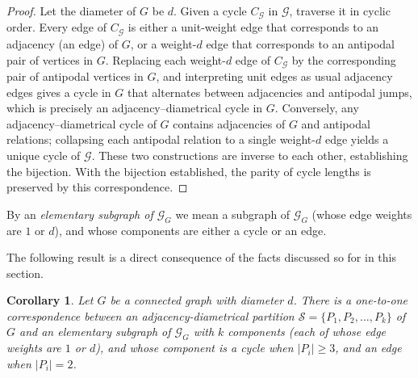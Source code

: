 \documentclass[12pt]{article}
\numberwithin{equation}{section}
\newtheorem{cor}{Corollary}[section]
\begin{document}
	\begin{proof}
		Let the diameter of $G$ be $d$.  Given a cycle $C_{\mathcal G}$ in $\mathcal G$, traverse it in cyclic order. Every edge of $C_{\mathcal G}$ is either a unit-weight edge that corresponds to an adjacency (an edge) of $G$, or a weight-$d$ edge that corresponds to an antipodal pair of vertices in $G$. Replacing each weight-$d$ edge of $C_{\mathcal G}$ by the corresponding pair of antipodal vertices in $G$, and interpreting unit edges as usual adjacency edges gives a cycle in $G$ that alternates between adjacencies and antipodal jumps, which is precisely an adjacency–diametrical cycle in $G$. Conversely, any adjacency–diametrical cycle of $G$ contains adjacencies of $G$ and antipodal relations; collapsing each antipodal relation to a single weight-$d$ edge yields a unique cycle of $\mathcal G$. These two constructions are inverse to each other, establishing the bijection. With the bijection established, the parity of cycle lengths is preserved by this correspondence.
	\end{proof}
	
	By an \textit{elementary subgraph of $\mathcal{G}_G$} we mean a subgraph of $\mathcal{G}_G$ (whose edge weights are $1$ or $d$),  and whose components are either a  cycle or an edge.
	
	The following result is a direct consequence of the facts discussed so for in this section.
	\begin{cor}\label{one-one2}
Let $G$ be a connected graph with diameter $d$.	There is a one-to-one correspondence between an adjacency-diametrical partition $\mathcal S = \{P_1, P_2, \dots, P_k\}$ of $G$ and an elementary subgraph of $\mathcal{G}_G$ with $k$ components (each of whose edge weights are $1$ or $d$), and whose component is a  cycle when $|P_i| \ge 3$, and an edge when $|P_i| = 2$.
	\end{cor}
	
\end{document}
